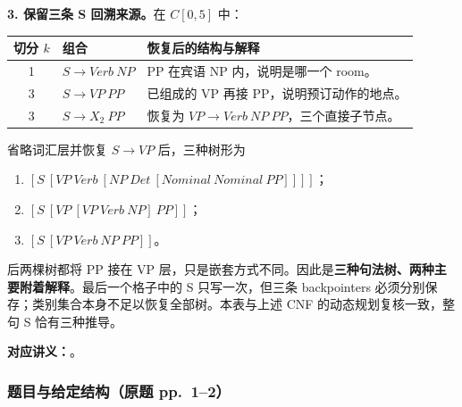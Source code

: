 \begin{checkedsolution}
\textbf{3. 保留三条 S 回溯来源。}在 $C[0,5]$ 中：
\begin{center}
\small
\begin{tabularx}{\textwidth}{@{}c l X@{}}
\toprule
切分 $k$ & 组合 & 恢复后的结构与解释 \\
\midrule
1 & $S\rightarrow Verb\ NP$ & PP 在宾语 NP 内，说明是哪一个 room。\\
3 & $S\rightarrow VP\ PP$ & 已组成的 VP 再接 PP，说明预订动作的地点。\\
3 & $S\rightarrow X_2\ PP$ & 恢复为 $VP\rightarrow Verb\ NP\ PP$，三个直接子节点。\\
\bottomrule
\end{tabularx}
\end{center}
省略词汇层并恢复 $S\rightarrow VP$ 后，三种树形为
\begin{enumerate}
  \item $[S\ [VP\ Verb\ [NP\ Det\ [Nominal\ Nominal\ PP]]]]$；
  \item $[S\ [VP\ [VP\ Verb\ NP]\ PP]]$；
  \item $[S\ [VP\ Verb\ NP\ PP]]$。
\end{enumerate}
后两棵树都将 PP 接在 VP 层，只是嵌套方式不同。因此是\textbf{三种句法树、两种主要附着解释}。最后一个格子中的 S 只写一次，但三条 backpointers 必须分别保存；类别集合本身不足以恢复全部树。本表与上述 CNF 的动态规划复核一致，整句 S 恰有三种推导。
\end{checkedsolution}


\textbf{对应讲义：}。

\subsubsection*{题目与给定结构（原题 pp.~1--2）}

